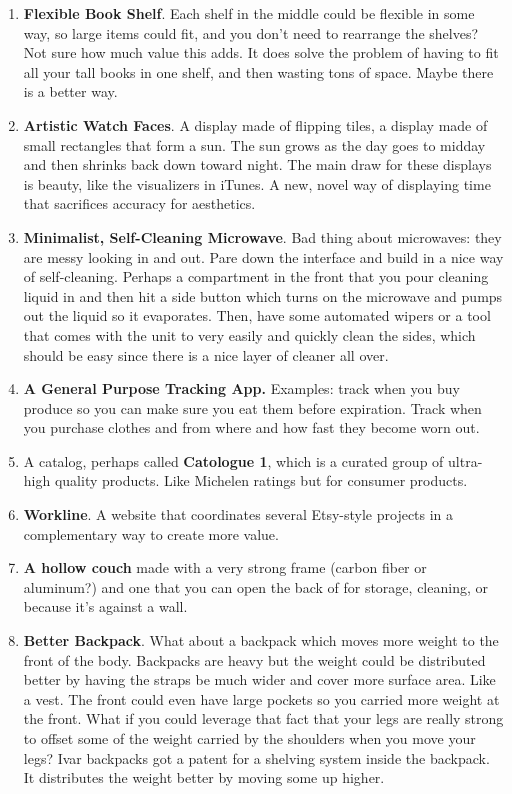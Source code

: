 \documentclass[paper=a4, fontsize=11pt]{scrartcl} %
\numberwithin{equation}{section} %
\numberwithin{figure}{section} %
\numberwithin{table}{section} %
\begin{document}
\begin{enumerate}
\item \textbf{Flexible Book Shelf}.  Each shelf in the middle could be flexible in some way, so large items could fit, and you don't need to rearrange the shelves?  Not sure how much value this adds.  It does solve the problem of having to fit all your tall books in one shelf, and then wasting tons of space.  Maybe there is a better way.   

\item \textbf{Artistic Watch Faces}.  A display made of flipping tiles, a display made of small rectangles that form a sun.  The sun grows as the day goes to midday and then shrinks back down toward night.  The main draw for these displays is beauty, like the visualizers in iTunes.  A new, novel way of displaying time that sacrifices accuracy for aesthetics.  

\item \textbf{Minimalist, Self-Cleaning Microwave}.  Bad thing about microwaves: they are messy looking in and out.  Pare down the interface and build in a nice way of self-cleaning.  Perhaps a compartment in the front that you pour cleaning liquid in and then hit a side button which turns on the microwave and pumps out the liquid so it evaporates.  Then, have some automated wipers or a tool that comes with the unit to very easily and quickly clean the sides, which should be easy since there is a nice layer of cleaner all over. 

\item \textbf{A General Purpose Tracking App.}  Examples: track when you buy produce so you can make sure you eat them before expiration.  Track when you purchase clothes and from where and how fast they become worn out.  

\item A catalog, perhaps called \textbf{Catologue 1}, which is a curated group of ultra-high quality products.  Like Michelen ratings but for consumer products.

\item \textbf{Workline}.  A website that coordinates several Etsy-style projects in a complementary way to create more value.

\item \textbf{A hollow couch} made with a very strong frame (carbon fiber or aluminum?) and one that you can open the back of for storage, cleaning, or because it's against a wall.  

\item  \textbf{Better Backpack}.  What about a backpack which moves more weight to the front of the body.  Backpacks are heavy but the weight could be distributed better by having the straps be much wider and cover more surface area.  Like a vest.  The front could even have large pockets so you carried more weight at the front.  What if you could leverage that fact that your legs are really strong to offset some of the weight carried by the shoulders when you move your legs?  Ivar backpacks got a patent for a shelving system inside the backpack.  It distributes the weight better by moving some up higher.  


\end{enumerate}
\end{document}
